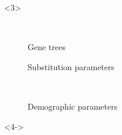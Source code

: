 \begin{frame}[t,label=fullmodel]
\begin{minipage}[t][0.45\textheight][t]{\linewidth}
        \begin{adjustwidth}{.11\textwidth}{0em}
        \hspace{0.5\textwidth}
            \begin{onlyenv}<3>
                \begin{description}
                    \item[\ ] Gene trees
                    \item[\allParameters{}] Substitution parameters
                    \item[\ ] Demographic parameters
                \end{description}
            \end{onlyenv}
        \end{adjustwidth}
        
        \vspace{-7mm}
        \begin{uncoverenv}<4->
            \begin{displaybox}[0.85\linewidth]


\end{displaybox}
\end{uncoverenv}
\end{minipage}
\end{frame}

